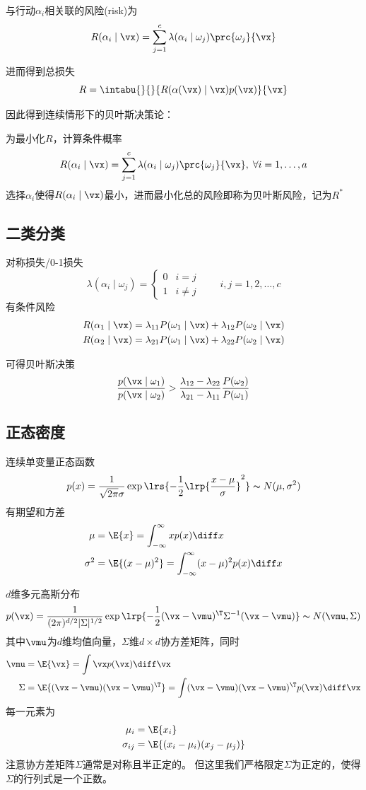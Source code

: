 与行动$\alpha_i$相关联的风险(risk)为
\[R(\alpha_i\mid\vx)=\sum_{j=1}^c\lambda(\alpha_i\mid\omega_j)\prc{\omega_j}{\vx}\]

进而得到总损失
\[R=\intabu{}{}{R(\alpha(\vx)\mid\vx)p(\vx)}{\vx}\]

因此得到连续情形下的贝叶斯决策论：
\begin{theorem}
为最小化$R$，计算条件概率
\[R(\alpha_i\mid\vx)=\sum_{j=1}^c\lambda(\alpha_i\mid\omega_j)\prc{\omega_j}{\vx},\;\forall i=1,\ldots,a\]
选择$\alpha_i$使得$R(\alpha_i\mid\vx)$最小，进而最小化总的风险即称为贝叶斯风险，记为$R^*$
\end{theorem}

\subsection{二类分类}
对称损失/0-1损失
\[\lambda(\alpha_i\mid\omega_j)=
\begin{cases}
0 & i=j\\
1 & i\ne j
\end{cases}
\qquad i,j=1,2,\ldots,c\]
有条件风险
\[\begin{aligned}
R(\alpha_1\mid\vx)&=\lambda_{11}P(\omega_1\mid\vx)+\lambda_{12}P(\omega_2\mid\vx)\\
R(\alpha_2\mid\vx)&=\lambda_{21}P(\omega_1\mid\vx)+\lambda_{22}P(\omega_2\mid\vx)
\end{aligned}\]

可得贝叶斯决策
\[\frac{p(\vx\mid\omega_1)}{p(\vx\mid\omega_2)}>\frac{\lambda_{12}-\lambda_{22}}{\lambda_{21}-\lambda_{11}}\frac{P(\omega_2)}{P(\omega_1)}\]

\subsection{正态密度}
连续单变量正态函数
\[p(x)=\frac{1}{\sqrt{2\pi}\sigma}\exp\lrs{-\frac{1}{2}\lrp{\frac{x-\mu}{\sigma}}^2}\thicksim N(\mu,\sigma^2)\]
有期望和方差
\[\begin{aligned}
\mu &= \E{x}=\int_{-\infty}^\infty xp(x)\diff x\\
\sigma^2 &=\E{(x-\mu)^2}=\int_{-\infty}^\infty (x-\mu)^2 p(x)\diff x
\end{aligned}\]

$d$维多元高斯分布
\[p(\vx)=\frac{1}{(2\pi)^{d/2}|\Sigma|^{1/2}}\exp\lrp{-\frac{1}{2}(\vx-\vmu)^\T\Sigma^{-1}(\vx-\vmu)}\thicksim N(\vmu,\Sigma)\]
其中$\vmu$为$d$维均值向量，$\Sigma$维$d\times d$协方差矩阵，同时
\[\begin{aligned}
\vmu &=\E{\vx} = \int\vx p(\vx)\diff\vx\\
\Sigma &=\E{(\vx-\vmu)(\vx-\vmu)^\T} = \int(\vx-\vmu)(\vx-\vmu)^\T p(\vx)\diff\vx
\end{aligned}\]
每一元素为
\[\begin{aligned}
\mu_i &= \E{x_i}\\
\sigma_{ij} &= \E{(x_i-\mu_i)(x_j-\mu_j)}
\end{aligned}\]
注意协方差矩阵$\Sigma$通常是对称且半正定的。
但这里我们严格限定$\Sigma$为正定的，使得$\Sigma$的行列式是一个正数。

